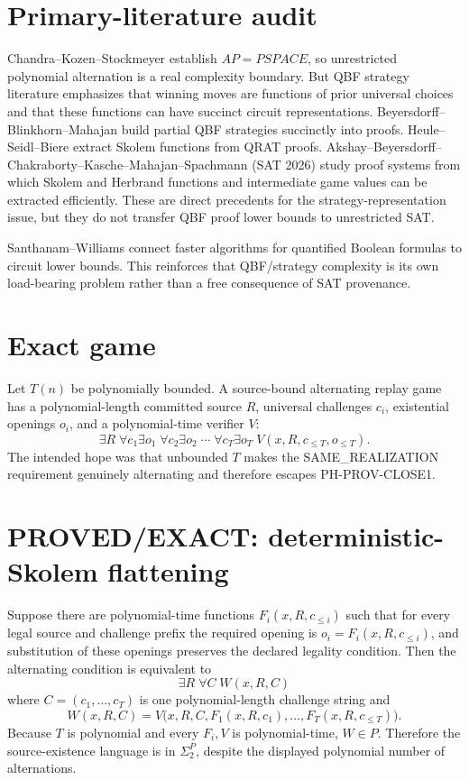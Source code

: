 \documentclass[11pt]{article}
\begin{document}
\section*{Primary-literature audit}
Chandra--Kozen--Stockmeyer establish \(AP=PSPACE\), so unrestricted polynomial alternation is a real complexity boundary. But QBF strategy literature emphasizes that winning moves are functions of prior universal choices and that these functions can have succinct circuit representations. Beyersdorff--Blinkhorn--Mahajan build partial QBF strategies succinctly into proofs. Heule--Seidl--Biere extract Skolem functions from QRAT proofs. Akshay--Beyersdorff--Chakraborty--Kasche--Mahajan--Spachmann (SAT 2026) study proof systems from which Skolem and Herbrand functions and intermediate game values can be extracted efficiently. These are direct precedents for the strategy-representation issue, but they do not transfer QBF proof lower bounds to unrestricted SAT.

Santhanam--Williams connect faster algorithms for quantified Boolean formulas to circuit lower bounds. This reinforces that QBF/strategy complexity is its own load-bearing problem rather than a free consequence of SAT provenance.

\section*{Exact game}
Let \(T(n)\) be polynomially bounded. A source-bound alternating replay game has a polynomial-length committed source \(R\), universal challenges \(c_i\), existential openings \(o_i\), and a polynomial-time verifier \(V\):
\[
\exists R\;\forall c_1\exists o_1\;\forall c_2\exists o_2\;\cdots\;\forall c_T\exists o_T\;V(x,R,c_{\le T},o_{\le T}).
\]
The intended hope was that unbounded \(T\) makes the SAME\_REALIZATION requirement genuinely alternating and therefore escapes PH-PROV-CLOSE1.

\section*{PROVED/EXACT: deterministic-Skolem flattening}
Suppose there are polynomial-time functions \(F_i(x,R,c_{\le i})\) such that for every legal source and challenge prefix the required opening is \(o_i=F_i(x,R,c_{\le i})\), and substitution of these openings preserves the declared legality condition. Then the alternating condition is equivalent to
\[
\boxed{\exists R\;\forall C\;W(x,R,C)}
\]
where \(C=(c_1,\ldots,c_T)\) is one polynomial-length challenge string and
\[
W(x,R,C)=V\bigl(x,R,C,F_1(x,R,c_1),\ldots,F_T(x,R,c_{\le T})\bigr).
\]
Because \(T\) is polynomial and every \(F_i,V\) is polynomial-time, \(W\in P\). Therefore the source-existence language is in \(\Sigma_2^P\), despite the displayed polynomial number of alternations.
\end{document}
